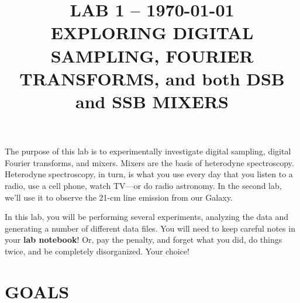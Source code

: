 \documentclass[12pt,preprint]{aastex}
\begin{document}
\def\simlt{\lower.5ex\hbox{$\; \buildrel < \over \sim \;$}}
\def\simgt{\lower.5ex\hbox{$\; \buildrel > \over \sim \;$}}

\title {LAB 1 -- \today \\ EXPLORING DIGITAL SAMPLING, FOURIER TRANSFORMS, and
  both DSB and SSB MIXERS}

\tableofcontents

	The purpose of this lab is to experimentally investigate digital
sampling, digital Fourier transforms, and mixers. Mixers are the basis
of heterodyne spectroscopy. Heterodyne spectroscopy, in turn, is what
you use every day that you listen to a radio, use a cell phone, watch
TV---or do radio astronomy. In the second lab, we'll use it
to observe the 21-cm line emission from our Galaxy.

In this lab, you will be performing several experiments, analyzing the
data and generating a number of different data files. You will need to
keep careful notes in your {\bf lab notebook}! Or, pay the penalty, and
forget what you did, do things twice, and be completely
disorganized. Your choice!

\section{GOALS} \label{goals}
\end{document}
